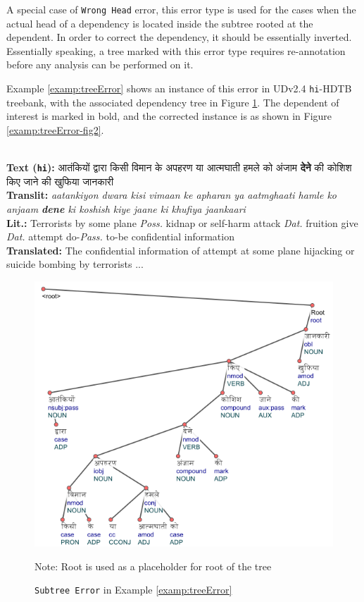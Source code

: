 A special case of \texttt{Wrong Head} error, this error type is used for the cases when the actual head of a dependency is located inside the subtree rooted at the dependent. In order to correct the dependency, it should be essentially inverted. Essentially speaking, a tree marked with this error type requires re-annotation before any analysis can be performed on it.

Example \ref{examp:treeError} shows an instance of this error in UDv2.4 \texttt{hi}-HDTB treebank, with the associated dependency tree in Figure \ref{examp:treeError-fig}. The dependent of interest is marked in bold, and the corrected instance is as shown in Figure \ref{examp:treeError-fig2}.
\begin{example}
\label{examp:treeError}
\textbf{ }\\
\textbf{Text (\texttt{hi}):} \texthindi{आतंकियों द्वारा किसी विमान के अपहरण या आत्मघाती हमले को अंजाम \textbf{देने} की कोशिश किए जाने की खुफिया जानकारी}\\
\textbf{Translit:} \textit{aatankiyon dwara kisi vimaan ke apharan ya aatmghaati hamle ko anjaam \textbf{dene} ki koshish kiye jaane ki khufiya jaankaari}\\
\textbf{Lit.:} Terrorists by some plane \textit{Poss.} kidnap or self-harm attack \textit{Dat.} fruition give \textit{Dat.} attempt do-\textit{Pass.} to-be confidential information\\
\textbf{Translated:} The confidential information of attempt at some plane hijacking or suicide bombing by terrorists ...
\end{example}

\begin{figure}[H]
    \centering
    \includegraphics[scale=0.7]{img/treeError.png}
    \caption{\texttt{Subtree Error} in Example \ref{examp:treeError}}
    \label{examp:treeError-fig}
    Note: Root is used as a placeholder for root of the tree
\end{figure}

